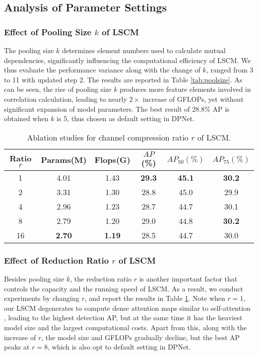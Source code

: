 \documentclass[lettersize,journal]{IEEEtran}
\begin{document}
\subsection{Analysis of Parameter Settings}
\subsubsection{Effect of Pooling Size $k$ of LSCM}
The pooling size $k$ determines element numbers used to calculate mutual dependencies, significantly influencing the computational efficiency of LSCM. We thus evaluate the performance variance along with the change of $k$, ranged from 3 to 11 with updated step 2. The results are reported in Table \ref{tab:poolsize}. As can be seen, the rise of pooling size $k$ produces more feature elements involved in correlation calculation, leading to nearly $2\times$ increase of GFLOPs, yet without significant expansion of model parameters. The best result of 28.8\% AP is obtained when $k$ is 5, thus chosen as default setting in DPNet.



\begin{table}[t!] 
	\tabcolsep 1.5mm \caption{Ablation studies for channel compression ratio $r$ of LSCM.} 
	\begin{center}
		\begin{tabular}{c|c|c|c|c|c}
			\toprule \multirow{1}{*}{Ratio $r$} &\multirow{1}{*}{Params(M)}  & \multirow{1}{*}{Flops(G)}& \multirow{1}{*}{$AP$(\%)}& \multirow{1}{*}{$AP_{50}(\%)$}& \multirow{1}{*}{$AP_{75}(\%)$}\\ \midrule
			1 &4.01 &1.43  &\textbf{29.3} &\textbf{45.1} &\textbf{30.2} \\
			2 &3.31 &1.30 &28.8 &45.0 &29.9  \\
4 &2.96 &1.23 &28.7 &44.7 &30.1  \\
8 &2.79 &1.20 &29.0 &44.8 &\textbf{30.2} \\
16 &\textbf{2.70} &\textbf{1.19} &28.5 &44.7 &30.0 \\
\bottomrule
		\end{tabular}\label{tab:reduceratio}
	\end{center}	
\end{table} 

\subsubsection{Effect of Reduction Ratio $r$ of LSCM}
Besides pooling size $k$, the reduction ratio $r$ is another important factor that controls the capacity and the running speed of LSCM. As a result, we conduct experiments by changing $r$, and report the results in Table \ref{tab:reduceratio}. Note when $r = 1$, our LSCM degenerates to compute dense attention maps similar to self-attention \cite{wang2018non}, leading to the highest detection AP, but at the same time it has the heaviest model size and the largest computational costs. Apart from this, along with the increase of $r$, the model size and GFLOPs gradually decline, but the best AP peaks at $r=8$, which is also opt to default setting in DPNet.
\end{document}
